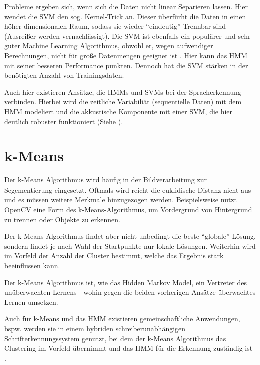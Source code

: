 Probleme ergeben sich, wenn sich die Daten nicht linear Separieren lassen. Hier wendet die SVM den sog. Kernel-Trick an. Dieser überfürht die Daten in einen höher-dimensionalen Raum, sodass sie wieder ``eindeutig'' Trennbar sind (Ausreißer werden vernachlässigt).
Die SVM ist ebenfalls ein populärer und sehr guter Machine Learning Algorithmus, obwohl er, wegen aufwendiger Berechnungen, nicht für große Datenmengen geeignet ist \cite[119]{marsland}. Hier kann das HMM mit seiner besseren Performance punkten. Dennoch hat die SVM stärken in der benötigten Anzahl von Trainingsdaten.

Auch hier existieren Ansätze, die HMMs und SVMs bei der Spracherkennung verbinden. Hierbei wird die zeitliche Variabiliät (sequentielle Daten) mit dem HMM modeliert und die akkustische Komponente mit einer SVM, die hier deutlich robuster funktioniert (Siehe \cite{hmmsvm}).


\section{k-Means} \label{sec:kmeans}
Der k-Means Algorithmus wird häufig in der Bildverarbeitung zur Segementierung eingesetzt. Oftmals wird reicht die euklidische Distanz nicht aus und es müssen weitere Merkmale hinzugezogen werden. Beispielsweise nutzt OpenCV eine Form des k-Means-Algorithmus, um Vordergrund von Hintergrund zu trennen oder Objekte zu erkennen.

Der k-Means-Algorithmus findet aber nicht unbedingt die beste ``globale'' Lösung, sondern findet je nach Wahl der Startpunkte nur lokale Lösungen. Weiterhin wird im Vorfeld der Anzahl der Cluster bestimmt, welche das  Ergebnis stark beeinflussen kann.

Der k-Means Algorithmus ist, wie das Hidden Markov Model, ein Vertreter des unüberwachten Lernens - wohin gegen die beiden vorherigen Ansätze überwachtes Lernen umsetzen. 

Auch für k-Means und das HMM existieren gemeinschaftliche Anwendungen, bspw. werden sie in einem hybriden schreiberunabhängigen Schrifterkennungssystem genutzt, bei dem der k-Means Algorithmus das Clustering im Vorfeld übernimmt und das HMM für die Erkennung zuständig ist \cite{hmmkm}. 
